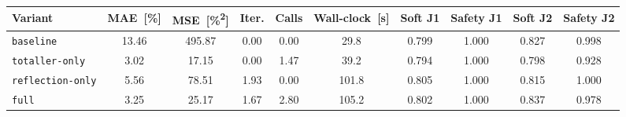 \begin{tabular}{lS[table-format=2.2]S[table-format=4.2]S[table-format=1.2]S[table-format=1.2]S[table-format=3.1]S[table-format=1.3]S[table-format=1.3]S[table-format=1.3]S[table-format=1.3]}
\toprule
Variant & {MAE~[\%]} & {MSE~[\unit{\percent\squared}]} & {Iter.} & {Calls} & {Wall-clock~[s]} & {Soft J1} & {Safety J1} & {Soft J2} & {Safety J2} \\
\midrule
\texttt{baseline} & 13.46 & 495.87 & 0.00 & 0.00 & 29.8 & 0.799 & 1.000 & 0.827 & 0.998 \\
\texttt{totaller-only} & 3.02 & 17.15 & 0.00 & 1.47 & 39.2 & 0.794 & 1.000 & 0.798 & 0.928 \\
\texttt{reflection-only} & 5.56 & 78.51 & 1.93 & 0.00 & 101.8 & 0.805 & 1.000 & 0.815 & 1.000 \\
\texttt{full} & 3.25 & 25.17 & 1.67 & 2.80 & 105.2 & 0.802 & 1.000 & 0.837 & 0.978 \\
\bottomrule
\end{tabular}
